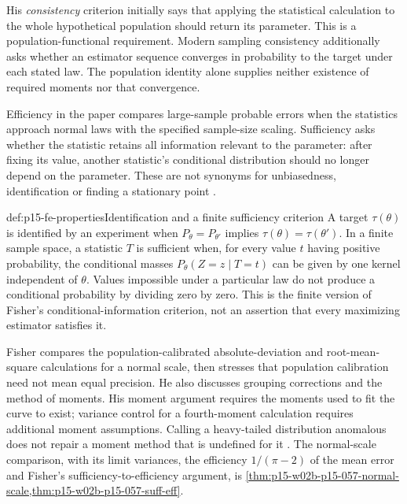 His \emph{consistency} criterion initially says that applying the
statistical calculation to the whole hypothetical population should
return its parameter. This is a population-functional requirement.
Modern sampling consistency additionally asks whether an estimator
sequence converges in probability to the target under each stated law.
The population identity alone supplies neither existence of required
moments nor that convergence.

Efficiency in the paper compares large-sample probable errors when the
statistics approach normal laws with the specified sample-size scaling.
Sufficiency asks whether the statistic retains all information relevant
to the parameter: after fixing its value, another statistic's conditional
distribution should no longer depend on the parameter. These are not
synonyms for unbiasedness, identification or finding a stationary point
\cite[pp.~316--317]{Fisher1922Foundations}.

\begin{hbdefinition}{def:p15-fe-properties}{Identification and a finite sufficiency criterion}
A target \(\tau(\theta)\) is identified by an experiment when
\(P_\theta=P_{\theta'}\) implies
\(\tau(\theta)=\tau(\theta')\). In a finite sample space, a
statistic \(T\) is sufficient when, for every value \(t\) having
positive probability, the conditional masses
\(P_\theta(Z=z\mid T=t)\) can be given by one kernel independent
of \(\theta\). Values impossible under a particular law do not
produce a conditional probability by dividing zero by zero.
This is the finite version of Fisher's conditional-information criterion,
not an assertion that every maximizing estimator satisfies it.
\end{hbdefinition}

Fisher compares the population-calibrated absolute-deviation and
root-mean-square calculations for a normal scale, then stresses that
population calibration need not mean equal precision. He also discusses
grouping corrections and the method of moments. His moment argument
requires the moments used to fit the curve to exist; variance control
for a fourth-moment calculation requires additional moment assumptions.
Calling a heavy-tailed distribution anomalous does not repair a moment
method that is undefined for it \cite[pp.~316, 318--322]{Fisher1922Foundations}.
The normal-scale comparison, with its limit variances, the efficiency
\(1/(\pi-2)\) of the mean error and Fisher's sufficiency-to-efficiency
argument, is \cref{thm:p15-w02b-p15-057-normal-scale,thm:p15-w02b-p15-057-suff-eff}.

